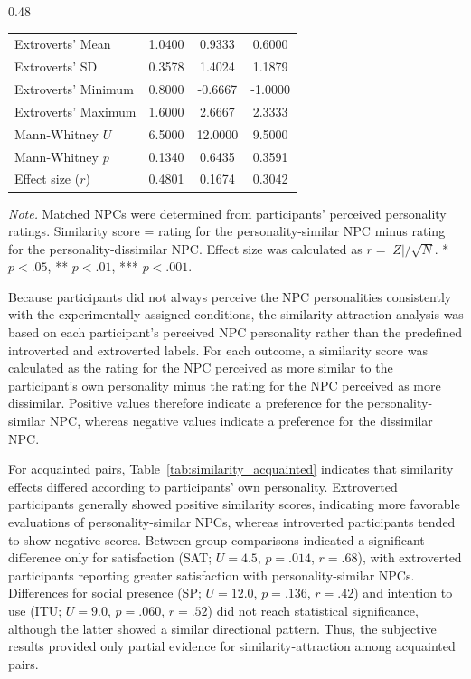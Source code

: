 \documentclass[a4paper,fleqn]{cas-sc}
\begin{document}
\begin{table}[t]
\begin{subtable}[t]{0.48\textwidth}
\begin{tabular}{lccc}
Extroverts' Mean
& 1.0400 & 0.9333 & 0.6000 \\
Extroverts' SD
& 0.3578 & 1.4024 & 1.1879 \\
Extroverts' Minimum
& 0.8000 & -0.6667 & -1.0000 \\
Extroverts' Maximum
& 1.6000 & 2.6667 & 2.3333 \\
\midrule
Mann-Whitney $U$
& 6.5000 & 12.0000 & 9.5000 \\
Mann-Whitney $p$
& 0.1340 & 0.6435 & 0.3591 \\
Effect size ($r$)
& 0.4801 & 0.1674 & 0.3042 \\
\bottomrule
\end{tabular}
\end{subtable}

\vspace{2mm}
\begin{minipage}{0.98\textwidth}
\footnotesize
\textit{Note.} Matched NPCs were determined from participants' perceived personality ratings.
Similarity score = rating for the personality-similar NPC minus rating for the personality-dissimilar NPC.
Effect size was calculated as $r = |Z|/\sqrt{N}$.
* $p < .05$, ** $p < .01$, *** $p < .001$.
\end{minipage}

\end{table}

Because participants did not always perceive the NPC personalities consistently with the experimentally assigned conditions, the similarity-attraction analysis was based on each participant's perceived NPC personality rather than the predefined introverted and extroverted labels. For each outcome, a similarity score was calculated as the rating for the NPC perceived as more similar to the participant's own personality minus the rating for the NPC perceived as more dissimilar. Positive values therefore indicate a preference for the personality-similar NPC, whereas negative values indicate a preference for the dissimilar NPC.

For acquainted pairs, Table~\ref{tab:similarity_acquainted} indicates that similarity effects differed according to participants' own personality. Extroverted participants generally showed positive similarity scores, indicating more favorable evaluations of personality-similar NPCs, whereas introverted participants tended to show negative scores. Between-group comparisons indicated a significant difference only for satisfaction (SAT; $U=4.5$, $p=.014$, $r=.68$), with extroverted participants reporting greater satisfaction with personality-similar NPCs. Differences for social presence (SP; $U=12.0$, $p=.136$, $r=.42$) and intention to use (ITU; $U=9.0$, $p=.060$, $r=.52$) did not reach statistical significance, although the latter showed a similar directional pattern. Thus, the subjective results provided only partial evidence for similarity-attraction among acquainted pairs.
\end{document}
